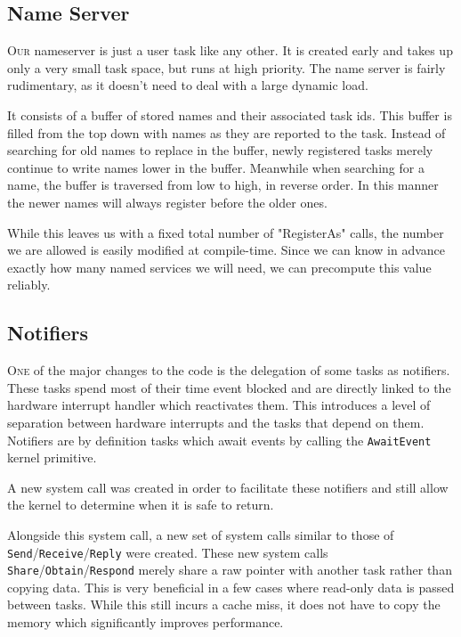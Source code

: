 \documentclass{article}
\begin{document}
\subsection*{Name Server}

\textsc{Our} nameserver is just a user task like any other. It is created early and takes
up only a very small task space, but runs at high priority. The name server is
fairly rudimentary, as it doesn't need to deal with a large dynamic load.

It consists of a buffer of stored names and their associated task ids. This
buffer is filled from the top down with names as they are reported to the task.
Instead of searching for old names to replace in the buffer, newly registered
tasks merely continue to write names lower in the buffer. Meanwhile when
searching for a name, the buffer is traversed from low to high, in reverse
order. In this manner the newer names will always register before the older
ones.

While this leaves us with a fixed total number of "RegisterAs" calls, the number
we are allowed is easily modified at compile-time. Since we can know in advance
exactly how many named services we will need, we can precompute this value
reliably.


\subsection*{Notifiers}

\textsc{One} of the major changes to the code is the delegation of some tasks as
notifiers. These tasks spend most of their time event blocked and are directly
linked to the hardware interrupt handler which reactivates them. This introduces
a level of separation between hardware interrupts and the tasks that depend on
them. Notifiers are by definition tasks which await events by calling the
\texttt{AwaitEvent} kernel primitive.

A new system call was created in order to facilitate these notifiers and still
allow the kernel to determine when it is safe to return.

Alongside this system call, a new set of system calls similar to those of
\texttt{Send}/\texttt{Receive}/\texttt{Reply} were created. These new system
calls \texttt{Share}/\texttt{Obtain}/\texttt{Respond} merely share a raw pointer
with another task rather than copying data. This is very beneficial in a few
cases where read-only data is passed between tasks. While this still incurs a
cache miss, it does not have to copy the memory which significantly improves
performance.
\end{document}
